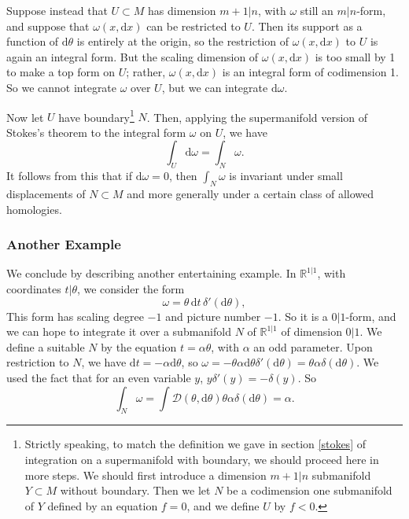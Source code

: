 \documentclass[11pt,a4paper]{article}
\def\D{{\mathcal D}}
\def\d{{\mathrm d}}
\def\R{{\mathbb R}}
\def\D{{\mathcal D}}
\begin{document}
Suppose instead that $U\subset M$ has dimension $m+1|n$, with $\omega$ still an $m|n$-form,
and suppose that $\omega(x,\d x)$ can be restricted to $U$.  Then its support as a function of $\d\theta$
is entirely at the origin, so the restriction of $\omega(x,\d x)$ to $U$ is again 
an integral form.  But the scaling dimension of $\omega(x,\d x)$ is too small by 1 to make a top form on $U$;
rather, $\omega(x,\d x)$  is an integral form of codimension 1.      
So we cannot integrate $\omega$ over $U$, but we can integrate $\d\omega$.

Now let $U$ have boundary\footnote{Strictly speaking, to match the definition we gave in section \ref{stokes} of integration on a 
supermanifold with boundary, we should proceed
here in more steps.  We should first introduce a dimension $m+1|n$ submanifold $Y\subset M$ without boundary.  Then we let $N$ be a 
codimension one submanifold of $Y$
defined by an equation $f=0$, and we define $U$ by $f<0$.}  $N$.  Then, applying the supermanifold version of Stokes's theorem to 
the integral form $\omega$ on $U$, we have
\begin{equation}\label{zoboxx}\int_U\d\omega =\int_N\omega. \end{equation}
It follows from this that if $\d\omega=0$, then $\int_N\omega$ is invariant under small displacements of $N\subset M$ and 
more generally under a certain class of allowed homologies.    

\subsubsection{Another Example}\label{dolfott}

We conclude by describing another entertaining example.  In $\R^{1|1}$, with coordinates $t|\theta$, we consider the form
\begin{equation}\label{ifo} \omega = \theta\, \d t\, \delta'(\d\theta),  \end{equation}
This form has scaling degree $-1$ and picture number $-1$.  So it is a $0|1$-form, and we can hope to integrate it over a submanifold $N$
of $\R^{1|1}$ of dimension $0|1$.  We define a suitable $N$ by the equation $t=\alpha\theta$, with $\alpha$ an odd parameter.  Upon restriction to
$N$, we have $\d t =-\alpha \d\theta$, so $\omega=-\theta\alpha \d\theta \delta'(\d\theta)=\theta\alpha \delta(\d\theta)$.  We used the fact that for
an even variable $y$, $y\delta'(y)=-\delta(y)$.  So
\begin{equation}\int_N\omega =\int \D(\theta,\d\theta) \theta\alpha \delta(\d\theta)=\alpha.\end{equation}
\end{document}
